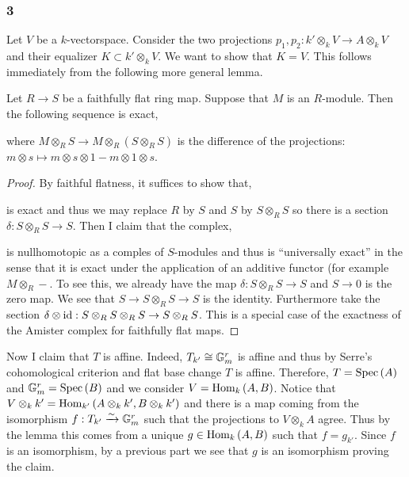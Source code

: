 \documentclass[12pt]{article}
\begin{document}
\subsubsection{3}

Let $V$ be a $k$-vectorspace. Consider the two projections $p_1, p_2 : k' \otimes_k V \to A \otimes_k V$ and their equalizer $K \subset k' \otimes_k V$. We want to show that $K = V$. This follows immediately from the following more general lemma.

\begin{lemma}
Let $R \to S$ be a faithfully flat ring map. Suppose that $M$ is an $R$-module. Then the following sequence is exact,
\begin{center}
\end{center}
where $M \otimes_R S \to M \otimes_R (S \otimes_R S)$ is the difference of the projections: $m \otimes s \mapsto m \otimes s \otimes 1 - m \otimes 1 \otimes s$.
\end{lemma}

\begin{proof}
By faithful flatness, it suffices to show that,
\begin{center}
\end{center}
is exact and thus we may replace $R$ by $S$ and $S$ by $S \otimes_R S$ so there is a section $\delta : S \otimes_R S \to S$. Then I claim that the complex,
\begin{center}
\end{center}
is nullhomotopic as a comples of $S$-modules and thus is ``universally exact'' in the sense that it is exact under the application of an additive functor (for example $M \otimes_R -$. To see this, we already have the map $\delta : S \otimes_R S \to S$ and $S \to 0$ is the zero map. We see that $S \to S \otimes_R S \to S$ is the identity. Furthermore take the section $\delta \otimes \mathrm{id} : S \otimes_R S \otimes_R S \to S \otimes_R S$. This is a special case of the exactness of the Amister complex for faithfully flat maps. 
\end{proof}
\noindent
Now I claim that $T$ is affine. Indeed, $T_{k'} \cong \mathbb{G}_m^r$ is affine and thus by Serre's cohomological criterion and flat base change $T$ is affine. Therefore, $T = \mathrm{Spec}\left( A \right)$ and $\mathbb{G}_m^r = \mathrm{Spec}\left( B \right)$ and we consider $V = \mathrm{Hom}_{k} \left( A, B \right)$. Notice that $V \otimes_k k' = \mathrm{Hom}_{k'} \left( A \otimes_k k', B \otimes_k k' \right)$ and there is a map coming from the isomorphism $f : T_{k'} \xrightarrow{\sim} \mathbb{G}_m^r$ such that the projections to $V \otimes_k A$ agree. Thus by the lemma this comes from a unique $g \in \mathrm{Hom}_{k} \left( A, B \right)$ such that $f = g_{k'}$. Since $f$ is an isomorphism, by a previous part we see that $g$ is an isomorphism proving the claim.
\end{document}
